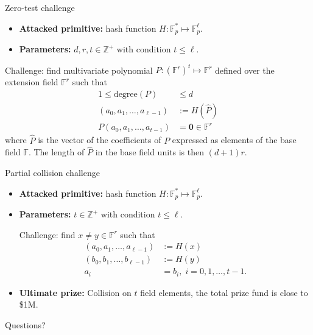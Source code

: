 \documentclass[t,8pt]{beamer}
\begin{document}
\begin{frame}{Zero-test challenge}

\begin{itemize}
    \item
\textbf{Attacked primitive:} hash function $H:\mathbb{F}_p^{*}\mapsto \mathbb{F}_p^{\ell}$.
\item
\textbf{Parameters:} $d,r,t\in\mathbb{Z}^{+}$ with condition $t\leq \ell$.

\end{itemize}
Challenge: find multivariate polynomial  $P:\left(\mathbb{F}^r\right)^t\mapsto\mathbb{F}^r$ defined over the extension field $\mathbb{F}^r$ such that
\begin{align}
1\leq \mathrm{degree}(P)&\leq d\\
(a_0,a_1,\ldots,a_{\ell-1}) &:=H(\widehat{P}) \\
P(a_0,a_1, \ldots,a_{t-1})&=\mathbf{0}\in\mathbb{F}^r\label{eq:cond-zero}
\end{align}
where $\widehat{P}$ is the vector of the coefficients of $P$ expressed as elements of the base field $\mathbb{F}$. The length of  $\widehat{P}$ in the base field units is then $(d+1)r$.
\end{frame}

\begin{frame}{Partial collision challenge}

\begin{itemize}
    \item
\textbf{Attacked primitive:} hash function $H:\mathbb{F}_p^{*}\mapsto \mathbb{F}_p^{\ell}$.
\item
\textbf{Parameters:} $ t\in\mathbb{Z}^{+}$ with condition $t\leq \ell$.

Challenge: find $x\neq y\in\mathbb{F}^r$ such that
\begin{align}
(a_0,a_1,\ldots,a_{\ell-1}) &:=H(x) \\
(b_0,b_1,\ldots,b_{\ell-1}) &:=H(y) \\
a_i &= b_i ,\; i=0,1,\ldots,t-1.
\end{align}
\item \textbf{Ultimate prize:} Collision on $t$ field elements,
the total prize fund is close to \$1M.
\end{itemize}



\end{frame}


\begin{frame}[c]{}
\begin{center}
\Large{Questions?}
\end{center}
\end{frame}
\end{document}
